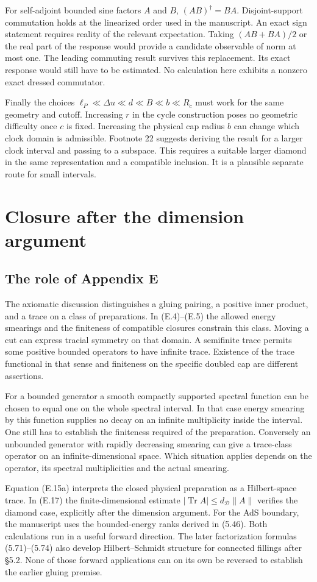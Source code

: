 \documentclass[11pt]{article}
\newcommand{\Tr}{\operatorname{Tr}}
\newcommand{\parttitle}[2]{\section{#1}}
\begin{document}
For self-adjoint bounded sine factors $A$ and $B$, $(AB)^\dagger=BA$. Disjoint-support commutation holds at the linearized order used in the manuscript. An exact sign statement requires reality of the relevant expectation. Taking $(AB+BA)/2$ or the real part of the response would provide a candidate observable of norm at most one. The leading commuting result survives this replacement. Its exact response would still have to be estimated. No calculation here exhibits a nonzero exact dressed commutator.

Finally the choices $\ell_P\ll\Delta u\ll d\ll B\ll b\ll R_c$ must work for the same geometry and cutoff. Increasing $r$ in the cycle construction poses no geometric difficulty once $c$ is fixed. Increasing the physical cap radius $b$ can change which clock domain is admissible. Footnote 22 suggests deriving the result for a larger clock interval and passing to a subspace. This requires a suitable larger diamond in the same representation and a compatible inclusion. It is a plausible separate route for small intervals.

\parttitle{Closure after the dimension argument}{Consequences of closure}
\subsection{The role of Appendix E}
The axiomatic discussion distinguishes a gluing pairing, a positive inner product, and a trace on a class of preparations. In (E.4)--(E.5) the allowed energy smearings and the finiteness of compatible closures constrain this class. Moving a cut can express tracial symmetry on that domain. A semifinite trace permits some positive bounded operators to have infinite trace. Existence of the trace functional in that sense and finiteness on the specific doubled cap are different assertions.

For a bounded generator a smooth compactly supported spectral function can be chosen to equal one on the whole spectral interval. In that case energy smearing by this function supplies no decay on an infinite multiplicity inside the interval. One still has to establish the finiteness required of the preparation. Conversely an unbounded generator with rapidly decreasing smearing can give a trace-class operator on an infinite-dimensional space. Which situation applies depends on the operator, its spectral multiplicities and the actual smearing.

Equation (E.15a) interprets the closed physical preparation as a Hilbert-space trace. In (E.17) the finite-dimensional estimate $|\Tr A|\le d_{\mathcal D}\|A\|$ verifies the diamond case, explicitly after the dimension argument. For the AdS boundary, the manuscript uses the bounded-energy ranks derived in (5.46). Both calculations run in a useful forward direction. The later factorization formulas (5.71)--(5.74) also develop Hilbert--Schmidt structure for connected fillings after \S5.2. None of those forward applications can on its own be reversed to establish the earlier gluing premise.
\end{document}
